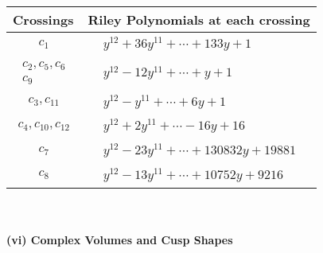 \documentclass[1p]{elsarticle_modified}
\theoremstyle{definition}
\begin{document}
\begin{tabular}{m{50pt}|m{274pt}}
Crossings & \hspace{64pt}Riley Polynomials at each crossing \\
\hline $$\begin{aligned}c_{1}\end{aligned}$$&$\begin{aligned}
&y^{12}+36 y^{11}+\cdots+133 y+1
\end{aligned}$\\
\hline $$\begin{aligned}c_{2},c_{5},c_{6}\\c_{9}\end{aligned}$$&$\begin{aligned}
&y^{12}-12 y^{11}+\cdots+y+1
\end{aligned}$\\
\hline $$\begin{aligned}c_{3},c_{11}\end{aligned}$$&$\begin{aligned}
&y^{12}- y^{11}+\cdots+6 y+1
\end{aligned}$\\
\hline $$\begin{aligned}c_{4},c_{10},c_{12}\end{aligned}$$&$\begin{aligned}
&y^{12}+2 y^{11}+\cdots-16 y+16
\end{aligned}$\\
\hline $$\begin{aligned}c_{7}\end{aligned}$$&$\begin{aligned}
&y^{12}-23 y^{11}+\cdots+130832 y+19881
\end{aligned}$\\
\hline $$\begin{aligned}c_{8}\end{aligned}$$&$\begin{aligned}
&y^{12}-13 y^{11}+\cdots+10752 y+9216
\end{aligned}$\\
\hline
\end{tabular}\\~\\
\newpage\flushleft \textbf{(vi) Complex Volumes and Cusp Shapes}
\end{document}
